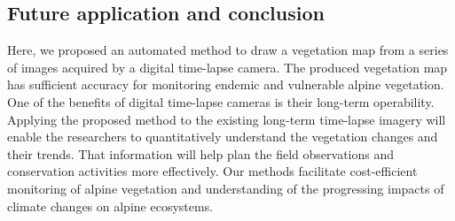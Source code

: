 \documentclass{article}
\begin{document}
\hypertarget{future-application-and-conclusion}{%
\subsection{Future application and conclusion}\label{future-application-and-conclusion}}

Here, we proposed an automated method to draw a vegetation map from a series of images acquired by a digital time-lapse camera. The produced vegetation map has sufficient accuracy for monitoring endemic and vulnerable alpine vegetation. One of the benefits of digital time-lapse cameras is their long-term operability. Applying the proposed method to the existing long-term time-lapse imagery will enable the researchers to quantitatively understand the vegetation changes and their trends. That information will help plan the field observations and conservation activities more effectively. Our methods facilitate cost-efficient monitoring of alpine vegetation and understanding of the progressing impacts of climate changes on alpine ecosystems.



\end{document}
